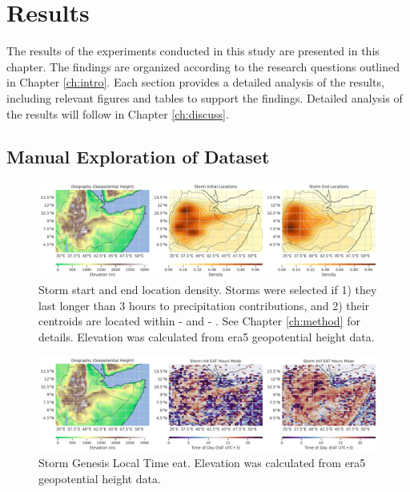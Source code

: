\chapter{Results}
\label{ch:results}

The results of the experiments conducted in this study are presented in this chapter. The findings are organized according to the research questions outlined in Chapter \ref{ch:intro}. Each section provides a detailed analysis of the results, including relevant figures and tables to support the findings. Detailed analysis of the results will follow in Chapter \ref{ch:discuss}.

\section{Manual Exploration of Dataset}

\begin{figure}[ht]
    \centering
    \includegraphics[width=\textwidth]{../figures/generated/exploration/orography_storm_init_end_kde.png}
    \caption{Storm start and end location density. Storms were selected if 1) they last longer than 3 hours to precipitation contributions, and 2) their centroids are located within  -  and  -  \citep{Hill2023}. See Chapter \ref{ch:method} for details. Elevation was calculated from \acrshort{era5} geopotential height data.}
    \label{fig:orography_storm_init_end_kde}
\end{figure}

\begin{figure}[ht]
    \centering
    \includegraphics[width=\textwidth]{../figures/generated/exploration/orography_storm_init_eat_hours_mode_mean.png}
    \caption{Storm Genesis Local Time \acrlong{eat}. Elevation was calculated from \acrshort{era5} geopotential height data.}
    \label{fig:orography_storm_init_eat_hours_mode_mean}
\end{figure}

